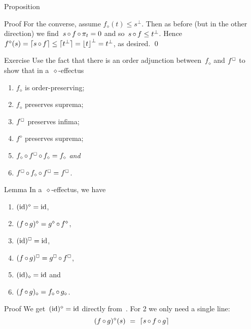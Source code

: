 \documentclass[b]{subfiles}
\begin{document}
\begin{parsec}
\begin{point}{Proposition}
\begin{point}{Proof}
For the converse, assume
    $f_\diamond(t) \leq s^\perp$.
Then as before (but in the other direction)
    we find~$s \mathop{\circ} f \mathop{\circ} \pi_t = 0$
    and so~$s \mathop{\circ} f \leq t^\perp$.
    Hence~$f^\diamond(s) =  \left\lceil s \mathop{\circ} f\right\rceil \leq \lceil t^\perp\rceil
                = \left\lfloor t\right\rfloor^\perp = t^\perp$, as desired. \qed
\end{point}
\end{point}
\begin{point}{Exercise}%
Use the fact that there is an
order adjunction between~$f_\diamond$ and $f^\BOX$
to show that in a~$\diamond$-effectus
\begin{multicols}{2}
\begin{enumerate}
    \item $f_\diamond$ is order-preserving;
    \item $f_\diamond$ preserves suprema;
    \item $f^\BOX$ preserves infima;
    \item $f^\diamond$ preserves suprema;
    \item $f_\diamond \after f^\BOX \after f_\diamond = f_\diamond$ \emph{and}
    \item $f^\BOX \after f_\diamond \after f^\BOX = f^\BOX$.
\end{enumerate}
\end{multicols}
\end{point}
\begin{point}{Lemma}%
In a~$\diamond$-effectus,
we have
\begin{multicols}{3}
\begin{enumerate}
\item
$(\operatorname{id})^\diamond = \operatorname{id}$,
\item
$(f\mathop{\circ} g)^\diamond
            =   g^\diamond \mathop{\circ} f^\diamond$,
\item
$(\id)^\BOX = \id$,
\item
$(f\after g)^\BOX
            =   g^\BOX \after f^\BOX$,
\item
$(\operatorname{id})_\diamond= \operatorname{id}$ and
\item
            $(f \mathop{\circ} g)_\diamond = f_\diamond \mathop{\circ} g_\diamond$.
\end{enumerate}
\end{multicols}
\begin{point}{Proof}%
We get~$(\operatorname{id})^\diamond = \operatorname{id}$
directly from~.
For 2 we only need a single line:
\begin{equation*}
(f\after g)^\diamond(s)
    \ =\  \ceil{s \after f \after g}

\end{equation*}
\end{point}
\end{point}
\end{parsec}
\end{document}
